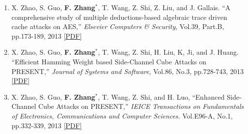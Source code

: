 \documentclass[11pt]{article}
\begin{document}
\begin{enumerate}
\item X. Zhao, S. Guo, {\bf F. Zhang}$^\ast$, T. Wang, Z. Shi, Z. Liu, and J. Gallais. ``A comprehensive study of multiple deductions-based algebraic trace driven cache attacks on AES,'' {\it Elsevier Computers \& Security}, Vol.39, Part.B, pp.173-189, 2013 \href{http://www.isee.zju.edu.cn/fanzhang/publications/2013\_cs\_TDCA.pdf}{[PDF]}

\item X. Zhao, S. Guo, {\bf F. Zhang}$^\ast$, T. Wang, Z. Shi, H. Liu, K, Ji, and J. Huang. ``Efficient Hamming Weight based Side-Channel Cube Attacks on PRESENT,'' {\it Journal of Systems and Software}, Vol.86, No.3, pp.728-743, 2013 \href{http://www.isee.zju.edu.cn/fanzhang/publications/2013\_jss\_PRESENT.pdf}{[PDF]}

\item X. Zhao, S. Guo, {\bf F. Zhang}$^\ast$, T. Wang, Z. Shi, and H. Luo, ``Enhanced Side-Channel Cube Attacks on PRESENT,'' {\it IEICE Transactions on Fundamentals of Electronics, Communications and Computer Sciences.}  Vol.E96-A, No.1, pp.332-339, 2013 \href{http://www.isee.zju.edu.cn/fanzhang/publications/2013\_IEICE\_PRESENT.pdf}{[PDF]}

\end{enumerate}
\end{document}
